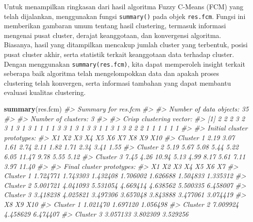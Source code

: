 \documentclass[
  oneside]{book}
\newenvironment{Shaded}{\begin{snugshade}}{\end{snugshade}}
\newcommand{\CommentTok}[1]{\textcolor[rgb]{0.56,0.35,0.01}{\textit{#1}}}
\newcommand{\FunctionTok}[1]{\textcolor[rgb]{0.13,0.29,0.53}{\textbf{#1}}}
\newcommand{\NormalTok}[1]{#1}
\begin{document}
Untuk menampilkan ringkasan dari hasil algoritma Fuzzy C-Means (FCM) yang telah dijalankan, menggunakan fungsi \texttt{summary()} pada objek \texttt{res.fcm}. Fungsi ini memberikan gambaran umum tentang hasil clustering, termasuk informasi mengenai pusat cluster, derajat keanggotaan, dan konvergensi algoritma. Biasanya, hasil yang ditampilkan mencakup jumlah cluster yang terbentuk, posisi pusat cluster akhir, serta statistik terkait keanggotaan data terhadap cluster. Dengan menggunakan \texttt{summary(res.fcm)}, kita dapat memperoleh insight terkait seberapa baik algoritma telah mengelompokkan data dan apakah proses clustering telah konvergen, serta informasi tambahan yang dapat membantu evaluasi kualitas clustering.

\begin{Shaded}
\begin{Highlighting}[]
\FunctionTok{summary}\NormalTok{(res.fcm)}
\CommentTok{\#\textgreater{} Summary for \textquotesingle{}res.fcm\textquotesingle{}}
\CommentTok{\#\textgreater{} }
\CommentTok{\#\textgreater{} Number of data objects:  35 }
\CommentTok{\#\textgreater{} }
\CommentTok{\#\textgreater{} Number of clusters:  3 }
\CommentTok{\#\textgreater{} }
\CommentTok{\#\textgreater{} Crisp clustering vector:}
\CommentTok{\#\textgreater{}  [1] 2 2 2 3 2 3 1 3 1 3 1 1 1 1 3 3 1 3 1 3 3 1 1 3 1 3 2 2 2 1 1 1 1 1 1}
\CommentTok{\#\textgreater{} }
\CommentTok{\#\textgreater{} Initial cluster prototypes:}
\CommentTok{\#\textgreater{}             X1   X2    X3   X4   X5   X6    X7   X8   X9   X10}
\CommentTok{\#\textgreater{} Cluster 1 2.19 3.07  1.61 2.74 2.11 1.82  1.71 2.34 3.41  1.55}
\CommentTok{\#\textgreater{} Cluster 2 5.19 5.67  5.08 5.44 5.22 6.05 11.47 9.78 5.55  5.12}
\CommentTok{\#\textgreater{} Cluster 3 7.45 4.26 10.94 5.13 4.99 8.17  5.61 7.11 3.97 11.40}
\CommentTok{\#\textgreater{} }
\CommentTok{\#\textgreater{} Final cluster prototypes:}
\CommentTok{\#\textgreater{}                 X1       X2       X3       X4       X5       X6       X7}
\CommentTok{\#\textgreater{} Cluster 1 1.724771 1.743303 1.432408 1.706002 1.626688 1.504833 1.335312}
\CommentTok{\#\textgreater{} Cluster 2 5.001721 4.041093 5.531054 4.669414 4.638562 5.500335 6.458007}
\CommentTok{\#\textgreater{} Cluster 3 3.418238 4.025821 3.497306 3.657048 3.843888 3.477061 3.074419}
\CommentTok{\#\textgreater{}                 X8       X9      X10}
\CommentTok{\#\textgreater{} Cluster 1 1.021470 1.697120 1.056498}
\CommentTok{\#\textgreater{} Cluster 2 7.009924 4.458629 6.474407}
\CommentTok{\#\textgreater{} Cluster 3 3.057133 3.802309 3.529256}

\end{Highlighting}
\end{Shaded}
\end{document}
